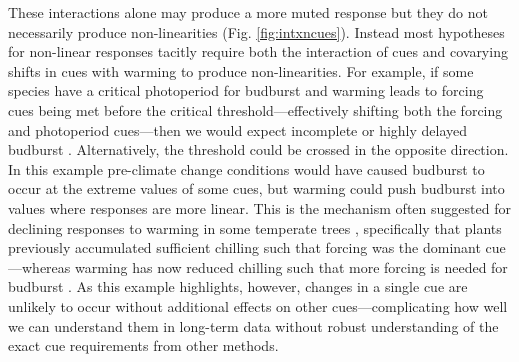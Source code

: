 \documentclass[11pt,letter]{article}
\begin{document}
These interactions alone may produce a more muted response but they do not necessarily produce non-linearities (Fig. \ref{fig:intxncues}). Instead most hypotheses for non-linear responses tacitly require both the interaction of cues and covarying shifts in cues with warming to produce non-linearities. For example, if some species have a critical photoperiod for budburst and warming leads to forcing cues being met before the critical threshold---effectively shifting both the forcing and photoperiod cues---then we would expect incomplete or highly delayed budburst \citep{Singh:2017,rinne2018}. Alternatively, the threshold could be crossed in the opposite direction. In this example pre-climate change conditions would have caused budburst to occur at the extreme values of some cues, but warming could push budburst into values where responses are more linear.  This is the mechanism often suggested for declining responses to warming in some temperate trees \citep{fu2015,piao2017,gauzere2019}, specifically that plants previously accumulated sufficient chilling such that forcing was the dominant cue---whereas warming has now reduced chilling such that more forcing is needed for budburst \citep[producing an overall muted effect when estimated as change in days per $\degree$C, see][for one example]{fu2015}. As this example highlights, however, changes in a single cue are unlikely to occur without additional effects on other cues---complicating how well we can understand them in long-term data without robust understanding of the exact cue requirements from other methods.


\end{document}
